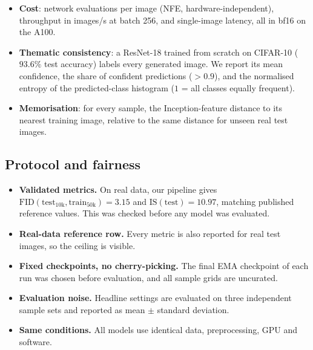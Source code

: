 \begin{itemize}
        data, so they are directly comparable.
  \item \textbf{Cost}: network evaluations per image (NFE, hardware-independent), throughput in images/s at batch
        256, and single-image latency, all in bf16 on the A100.
  \item \textbf{Thematic consistency}: a ResNet-18 trained from scratch on CIFAR-10 ($93.6\%$ test accuracy)
        labels every generated image. We report its mean confidence, the share of confident predictions
        ($>0.9$), and the normalised entropy of the predicted-class histogram ($1$ = all classes equally frequent).
  \item \textbf{Memorisation}: for every sample, the Inception-feature distance to its nearest training image,
        relative to the same distance for unseen real test images.
\end{itemize}

\subsection{Protocol and fairness}
\begin{itemize}
  \item \textbf{Validated metrics.} On real data, our pipeline gives $\mathrm{FID}(\text{test}_{10\text{k}},
        \text{train}_{50\text{k}})=3.15$ and $\mathrm{IS}(\text{test})=10.97$, matching published reference
        values. This was checked before any model was evaluated.
  \item \textbf{Real-data reference row.} Every metric is also reported for real test images, so the ceiling is
        visible.
  \item \textbf{Fixed checkpoints, no cherry-picking.} The final EMA checkpoint of each run was chosen before
        evaluation, and all sample grids are uncurated.
  \item \textbf{Evaluation noise.} Headline settings are evaluated on three independent sample sets and reported
        as mean $\pm$ standard deviation.
  \item \textbf{Same conditions.} All models use identical data, preprocessing, GPU and software.
\end{itemize}
